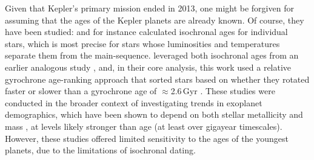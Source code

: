 \documentclass[11pt,twocolumn,tighten]{aastex63}
\begin{document}
Given that Kepler's primary mission ended in 2013, one might be forgiven for
assuming that the ages of the Kepler planets are already known.
Of course, they have been studied:
\citeauthor{Berger_2020b_rpage} and \citeauthor{Petigura_2022} for instance calculated
isochronal ages for individual stars, which is most
precise for stars whose luminosities and temperatures separate them
from the main-sequence.
\citeauthor{David_2021} leveraged
both isochronal ages from an earlier analogous study
\citep{Fulton_Petigura_2018_cks_vii}, and, in their core analysis, this work used a
relative gyrochrone age-ranking approach that sorted stars based on
whether they rotated faster or slower than a gyrochrone age of
$\approx$2.6\,Gyr \citep{Meibom_2015,Curtis_2020}.
These studies were conducted in the broader context of investigating
trends in exoplanet demographics, which have been shown to depend on
both stellar metallicity and mass \citet{Petigura_2018}, at levels
likely stronger than age (at least over gigayear timescales).
However, these studies offered limited sensitivity to the ages of the youngest
planets, due to the limitations of isochronal dating.




\end{document}
